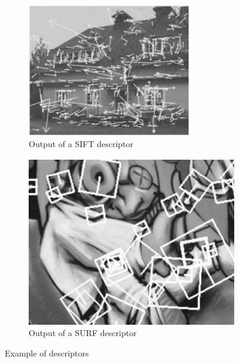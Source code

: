 \begin{figure}[htbp]
    \centering
    \begin{subfigure}[b]{0.38\textwidth}
        \centering
        \includegraphics[width=\textwidth]{images/siftdescresult.png}
        \caption{Output of a SIFT descriptor}
        \label{fig:siftres}
    \end{subfigure}
    \hfill
    \begin{subfigure}[b]{0.38\textwidth}
        \centering
        \includegraphics[width=\textwidth]{images/surfdescresult.png}
        \caption{Output of a SURF descriptor}
        \label{fig:surfres}
    \end{subfigure}
    \caption{Example of descriptors}
    \label{fig:descriptoroutputs}
\end{figure}


